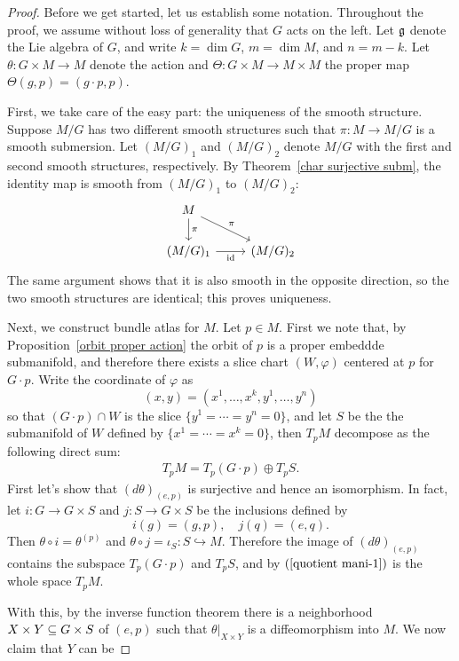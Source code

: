 \begin{proof}
Before we get started, let us establish some notation. Throughout the proof, we assume 
without loss of generality that $G$ acts on the left. Let $\mathfrak{g}$ denote the Lie algebra of 
$G$, and write $k=\dim G$, $m=\dim M$, and $n=m-k$. Let $\theta:G\times M\to M$ denote the 
action and $\varTheta:G\times M\to M\times M$ the proper map $\varTheta(g,p)=(g\cdot p,p)$.\par
First, we take care of the easy part: the uniqueness of the smooth structure. Suppose $M/G$ 
has two different smooth structures such that $\pi:M\to M/G$ is a smooth submersion. Let $(M/G)_1$ 
and $(M/G)_2$ denote $M/G$ with the first and second smooth structures, respectively. By 
Theorem~\ref{char surjective subm}, the identity map is smooth from $(M/G)_1$ to $(M/G)_2$:
\[\begin{tikzcd}
M\ar[d,"\pi"]\ar[rd,"\pi"]&\\
(M/G)_1\ar[r,swap,"\id"]&(M/G)_2
\end{tikzcd}\]
The same argument shows that it is also smooth in the opposite direction, so the two smooth 
structures are identical; this proves uniqueness.\par
Next, we construct bundle atlas for $M$. Let $p\in M$. First we note that, by 
Proposition~\ref{orbit proper action} the orbit of $p$ is a proper embeddde submanifold, and 
therefore there exists a slice chart $(W,\varphi)$ centered at $p$ for $G\cdot p$. Write the 
coordinate of $\varphi$ as 
\[(x,y)=(x^1,\dots,x^k,y^1,\dots,y^n)\]
so that $(G\cdot p)\cap W$ is the slice $\{y^1=\cdots=y^n=0\}$, and let $S$ be the the 
submanifold of $W$ defined by $\{x^1=\cdots=x^k=0\}$, then $T_pM$ decompose as the following 
direct sum:
\begin{align}\label{quotient mani-1}
T_pM=T_p(G\cdot p)\oplus T_pS.
\end{align}
First let's show that $(d\theta)_{(e,p)}$ is surjective and hence an isomorphism. In fact, let 
$i:G\to G\times S$ and $j:S\to G\times S$ be the inclusions defined by
\[i(g)=(g,p),\quad j(q)=(e,q).\]
Then $\theta\circ i=\theta^{(p)}$ and $\theta\circ j=\iota_S:S\hookrightarrow M$. Therefore 
the image of $(d\theta)_{(e,p)}$ contains the subspace $T_p(G\cdot p)$ and $T_pS$, and by 
$(\ref{quotient mani-1})$ is the whole space $T_pM$.\par
With this, by the inverse function theorem there is a neighborhood $X\times Y\subseteq G\times S$ of $(e,p)$ 
such that $\theta|_{X\times Y}$ is a diffeomorphism into $M$. We now claim that $Y$ can be 

\end{proof}

